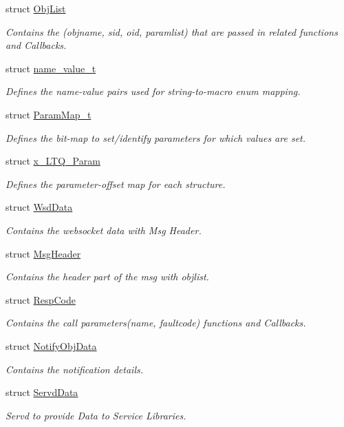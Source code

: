 \begin{DoxyCompactItemize}
struct \hyperlink{structObjList}{Obj\-List}
\begin{DoxyCompactList}\small\item\em Contains the (objname, sid, oid, paramlist) that are passed in related functions and Callbacks. \end{DoxyCompactList}\item 
struct \hyperlink{structname__value__t}{name\-\_\-value\-\_\-t}
\begin{DoxyCompactList}\small\item\em Defines the name-\/value pairs used for string-\/to-\/macro enum mapping. \end{DoxyCompactList}\item 
struct \hyperlink{structParamMap__t}{Param\-Map\-\_\-t}
\begin{DoxyCompactList}\small\item\em Defines the bit-\/map to set/identify parameters for which values are set. \end{DoxyCompactList}\item 
struct \hyperlink{structx__LTQ__Param}{x\-\_\-\-L\-T\-Q\-\_\-\-Param}
\begin{DoxyCompactList}\small\item\em Defines the parameter-\/offset map for each structure. \end{DoxyCompactList}\item 
struct \hyperlink{structWsdData}{Wsd\-Data}
\begin{DoxyCompactList}\small\item\em Contains the websocket data with Msg Header. \end{DoxyCompactList}\item 
struct \hyperlink{structMsgHeader}{Msg\-Header}
\begin{DoxyCompactList}\small\item\em Contains the header part of the msg with objlist. \end{DoxyCompactList}\item 
struct \hyperlink{structRespCode}{Resp\-Code}
\begin{DoxyCompactList}\small\item\em Contains the call parameters(name, faultcode) functions and Callbacks. \end{DoxyCompactList}\item 
struct \hyperlink{structNotifyObjData}{Notify\-Obj\-Data}
\begin{DoxyCompactList}\small\item\em Contains the notification details. \end{DoxyCompactList}\item 
struct \hyperlink{structServdData}{Servd\-Data}
\begin{DoxyCompactList}\small\item\em Servd to provide Data to Service Libraries. \end{DoxyCompactList}\end{DoxyCompactItemize}

